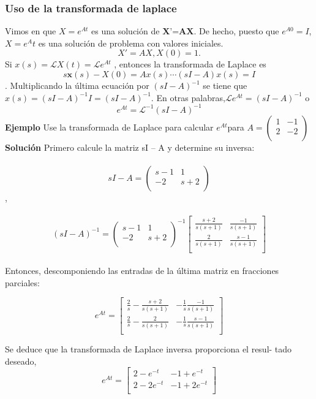 \documentclass[11.5pt]{article}
\begin{document}
\subsubsection{Uso de la transformada de laplace }
Vimos en  que $X=e^{At}$ es una solución de $\textbf{X'=AX}$. De hecho, puesto que $e^{A0}= I$, $X =e^At$ es una solución de problema con valores iniciales.\\
$$X'=AX , X(0)=1.$$
Si $x( s )=\mathcal{L} X ( t )=\mathcal{L}  e^{A t} $ , entonces la transformada de Laplace  es\\
$$s\textbf{x}(s)-X(0)=Ax(s) \cdots ( sI-A )x(s)=I $$.
Multiplicando la última ecuación por $(sI -A)^{-1}$ se tiene que $x(s)=(sI-A)^{-1} I = (sI-A)^{-1}$. En otras palabras,$\mathcal{L}{ e ^{At }}=( sI- A )^{-1} $ o
$$e^{At}=\mathcal{L}^{-1}{(sI-A)^{-1}}$$
\textbf{Ejemplo }
Use la transformada de Laplace para calcular $e^{At}$para
$A=\begin{pmatrix}
1&-1\\
2&-2\\
\end{pmatrix}$
\textbf{Solución} Primero calcule la matriz sI – A y determine su inversa:\\
\vspace{0.3cm}\\
$$sI-A=\begin{pmatrix}
s-1&1\\
-2&s+2\\
\end{pmatrix}$$,\\
\vspace{0.3cm}\\
$$\left.
(sI-A)^{-1}=\begin{pmatrix}
s-1&1\\
-2&s+2\\
\end{pmatrix}^{-1}
\begin{bmatrix}
\frac{s+2}{s(s+1)}&\frac{-1}{s(s+1)}\\
\frac{2}{s(s+1)}&\frac{s-1}{s(s+1)}\\
\end{bmatrix}
\right.$$
\vspace{0.3cm}\\
Entonces, descomponiendo las entradas de la última matriz en fracciones parciales:\\

\begin{large}
$$e^{At}=\begin{bmatrix}
\frac{2}{s}-\frac{s+2}{s(s+1)}&-\frac{1}{s}\frac{-1}{s(s+1)}\\
\frac{2}{s}-\frac{2}{s(s+1)}&-\frac{1}{s}\frac{s-1}{s(s+1)}\\
\end{bmatrix}$$

\end{large}
Se deduce que la transformada de Laplace inversa  proporciona el resul-
tado deseado,\\
$$e^{At}=\begin{bmatrix}
2-e^{-t}&-1+e^{-t}\\
2-2e^{-t}&-1+2e^{-t}\\
\end{bmatrix}$$
\end{document}
